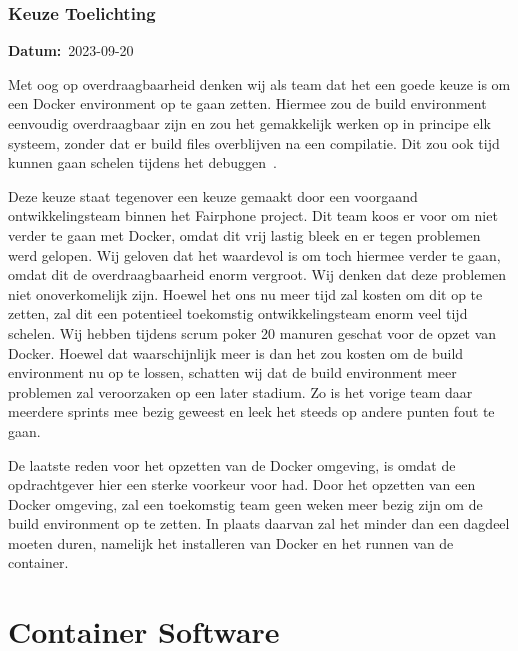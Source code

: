 \documentclass[a4paper]{report}
\newcommand{\personalbox}{
  \begin{tcolorbox}[hbox, colback=green!5!white,colframe=green!75!black,
    left=.1mm, right=.1mm, top=.1mm, bottom=.1mm, fontupper=\scriptsize\sffamily]
    Persoonlijke Keuze
  \end{tcolorbox}
}
\newcommand{\personalchoice}[1]{
  \section[ #1 ]{#1~\mbox{\raisebox{-2.5pt}{\personalbox}}}
}
\newcommand{\timestamp}[1]{
  \mbox{\scriptsize \textbf{Datum:} #1} \smallbreak
}
\begin{document}
\subsubsection{Keuze Toelichting}
\timestamp{2023-09-20}
Met oog op overdraagbaarheid denken wij als team dat het een goede keuze is om een Docker environment op te gaan zetten. 
Hiermee zou de build environment eenvoudig overdraagbaar zijn en zou het gemakkelijk werken op in principe elk systeem, zonder dat er build files overblijven na een compilatie.
Dit zou ook tijd kunnen gaan schelen tijdens het debuggen~\cite{AffinityBridgeDockerProsCons}. 
\par\smallskip
Deze keuze staat tegenover een keuze gemaakt door een voorgaand ontwikkelingsteam binnen het Fairphone project. 
Dit team koos er voor om niet verder te gaan met Docker, omdat dit vrij lastig bleek en er tegen problemen werd gelopen.
Wij geloven dat het waardevol is om toch hiermee verder te gaan, omdat dit de overdraagbaarheid enorm vergroot. Wij denken dat deze problemen niet onoverkomelijk zijn.
Hoewel het ons nu meer tijd zal kosten om dit op te zetten, zal dit een potentieel toekomstig ontwikkelingsteam enorm veel tijd schelen.
Wij hebben tijdens scrum poker 20 manuren geschat voor de opzet van Docker. Hoewel dat waarschijnlijk meer is dan het zou kosten om de build environment nu op te lossen, schatten wij dat de build environment meer problemen zal veroorzaken op een later stadium. 
Zo is het vorige team daar meerdere sprints mee bezig geweest en leek het steeds op andere punten fout te gaan.

\par\smallskip
De laatste reden voor het opzetten van de Docker omgeving, is omdat de opdrachtgever hier een sterke voorkeur voor had. Door het opzetten van een Docker omgeving, zal een toekomstig team geen weken meer bezig zijn om de build environment op te zetten. In plaats daarvan zal het minder dan een dagdeel moeten duren, namelijk het installeren van Docker en het runnen van de container.

\personalchoice{Container Software}
\end{document}
